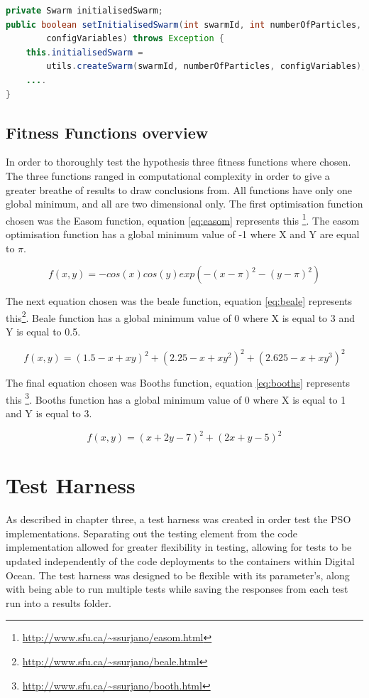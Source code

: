 \documentclass[oneside,12pt]{book}
\begin{document}
\begin{lstlisting}[basicstyle=\footnotesize, language=Java]
private Swarm initialisedSwarm;
public boolean setInitialisedSwarm(int swarmId, int numberOfParticles, ConfigVariables         
        configVariables) throws Exception {
    this.initialisedSwarm = 
        utils.createSwarm(swarmId, numberOfParticles, configVariables);
    ....
}
\end{lstlisting}
\label{listing:Distributedinitialisation}

\subsection{Fitness Functions overview}
In order to thoroughly test the hypothesis three fitness functions where chosen. The three functions ranged in computational complexity in order to give a greater breathe of results to draw conclusions from. All functions have only one global minimum, and all are two dimensional only. The first optimisation function chosen was the Easom function, equation \ref{eq:easom} represents this \footnote{\url{http://www.sfu.ca/~ssurjano/easom.html}}. The easom optimisation function has a global minimum value of -1 where X and Y are equal to $\pi$. 

\begin{equation}\label{eq:easom}
f(x,y)=-cos(x)cos(y)exp(-(x-\pi)^2-(y-\pi)^2)
\end{equation}

The next equation chosen was the beale function, equation \ref{eq:beale} represents this\footnote{\url{http://www.sfu.ca/~ssurjano/beale.html}}. Beale function has a global minimum value of 0 where X is equal to 3 and Y is equal to 0.5. 

\begin{equation}\label{eq:beale}
f(x, y) = (1.5-x+xy)^2+(2.25-x+xy^2)^2+(2.625-x+xy^3)^2
\end{equation}

The final equation chosen was Booths function, equation \ref{eq:booths} represents this \footnote{\url{http://www.sfu.ca/~ssurjano/booth.html}}. Booths function has a global minimum value of 0 where X is equal to 1 and Y is equal to 3. 

\begin{equation}\label{eq:booths}
f(x,y)=(x+2y-7)^2+(2x+y-5)^2
\end{equation}


\section{Test Harness}
As described in chapter three, a test harness was created in order test the PSO implementations. Separating out the testing element from the code implementation allowed for greater flexibility in testing, allowing for tests to be updated independently of the code deployments to the containers within Digital Ocean. The test harness was designed to be flexible with its parameter's, along with being able to run multiple tests while saving the responses from each test run into a results folder.
\end{document}
